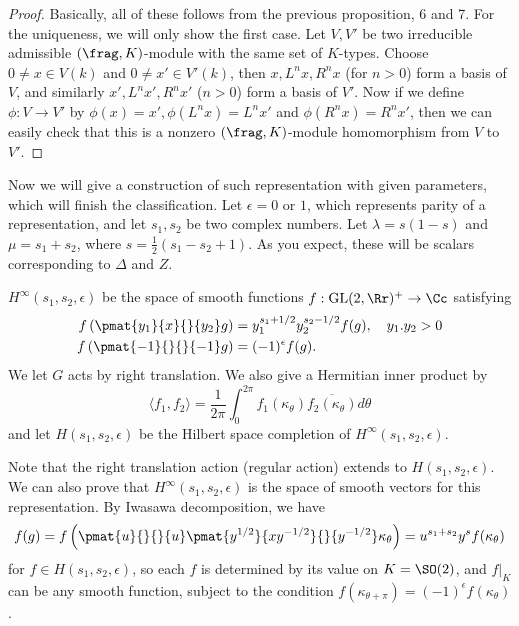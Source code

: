 \begin{proof}
Basically, all of these follows from the previous proposition, 6 and 7. For the uniqueness, we will only show the first case. 
Let $V, V'$ be two irreducible admissible $(\frag, K)$-module with the same set of $K$-types. 
Choose $0\neq x\in V(k)$ and $0\neq x'\in V'(k)$, then $x, L^{n}x, R^{n}x$ (for $n>0$) form a basis of $V$, and similarly $x', L^{n}x', R^{n}x'$ ($n>0$) form a basis of $V'$. 
Now if we define $\phi:V\to V'$ by $\phi(x) = x', \phi(L^{n}x) = L^{n}x'$ and $\phi(R^{n}x) = R^{n}x'$, then we can easily check that this is a nonzero $(\frag, K)$-module homomorphism from $V$ to $V'$. 
\end{proof}


Now we will give a construction of such representation with given parameters, which will finish the classification. Let $\epsilon = 0$ or $1$, which represents parity of a representation, and let $s_{1}, s_{2}$ be two complex numbers. Let $\lambda = s(1-s)$ and $\mu = s_{1} + s_{2}$, where $s = \frac{1}{2}(s_{1} - s_{2} + 1)$. As you expect, these will be scalars corresponding to $\Delta$ and $Z$. 

\begin{definition}
$H^{\infty}(s_{1}, s_{2}, \epsilon)$ be the space of smooth functions $f:\GL(2, \Rr)^{+}\to \Cc$ satisfying 
\begin{align*}
f\left(\pmat{y_{1}}{x}{}{y_{2}} g\right) &= y_{1}^{s_{1} + 1/2}y_{2}^{s_{2} - 1/2}f(g), \quad y_{1}. y_{2} >0 \\
f\left( \pmat{-1}{}{}{-1}g \right) &= (-1)^{\epsilon} f(g).
\end{align*}
We let $G$ acts by right translation. We also give a Hermitian inner product by 
$$
\langle f_{1}, f_{2}\rangle = \frac{1}{2\pi} \int_{0}^{2\pi} f_{1}(\kappa_{\theta})\overline{f_{2}(\kappa_{\theta})} d\theta
$$
and let $H(s_{1}, s_{2}, \epsilon)$ be the Hilbert space completion of $H^{\infty}(s_{1}, s_{2}, \epsilon)$. 
\end{definition}
Note that the right translation action (regular action) extends to $H(s_{1}, s_{2}, \epsilon)$. We can also prove that $H^{\infty}(s_{1}, s_{2}, \epsilon)$ is the space of smooth vectors for this representation. 
By Iwasawa decomposition, we have 
$$
f(g) = f\left( \pmat{u}{}{}{u} \pmat{y^{1/2}}{xy^{-1/2}}{}{y^{-1/2}} \kappa_{\theta}\right) = u^{s_{1} + s_{2}} y^{s} f(\kappa_{\theta})
$$
for $f\in H(s_{1}, s_{2}, \epsilon)$, so each $f$ is determined by its value on $K = \SO(2)$, and $f|_{K}$ can be any smooth function, subject to the condition $f(\kappa_{\theta+ \pi}) = (-1)^{\epsilon}f(\kappa_{\theta})$. 

